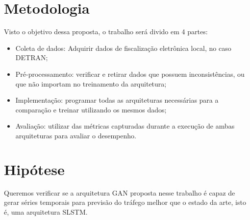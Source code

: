 \section{Metodologia}
Visto o objetivo dessa proposta, o trabalho será divido em 4 partes:

\begin{itemize}
    \item Coleta de dados: Adquirir dados de fiscalização eletrônica local, no caso \acrshort{DETRAN};
    \item Pré-processamento: verificar e retirar dados que possuem inconsistências, ou que não importam no treinamento da arquitetura;
    \item Implementação: programar todas as arquiteturas necessárias para a comparação e treinar utilizando os mesmos dados;
    \item Avaliação: utilizar das métricas capturadas durante a execução de ambas arquiteturas para avaliar o desempenho.
\end{itemize}


\section{Hipótese}

Queremos verificar se a arquitetura \acrshort{GAN} proposta nesse trabalho é capaz de gerar séries temporais para previsão do tráfego melhor que o estado da arte, isto é, uma arquitetura \acrshort{SLSTM}.